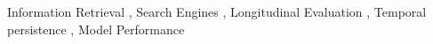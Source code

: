 \documentclass{ceurart}
\begin{document}
\begin{keywords}
  Information Retrieval \sep
  Search Engines \sep
  Longitudinal Evaluation \sep
  Temporal persistence \sep
  Model Performance
\end{keywords}

\maketitle




%
%

















\end{document}
